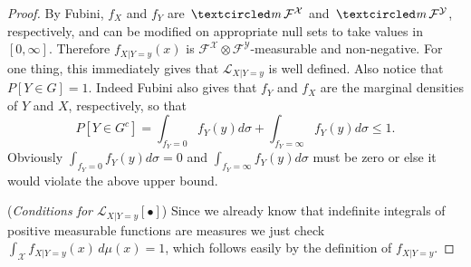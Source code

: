 \begin{proof}


By Fubini, $f_X$ and $f_Y$ are $\mcirc \mathcal F^{\mathcal X}$ and $\mcirc \mathcal F^{\mathcal Y}$, respectively, and can be modified on appropriate null sets to take values in $[0,\infty]$. Therefore
$f_{X|Y = y}(x)$ is $\mathcal F^{\mathcal X}\otimes \mathcal F^{\mathcal Y}$-measurable and non-negative.
For one thing, this immediately gives that $\mathcal L_{X|Y=y}$ is well defined.
Also notice that $P[Y\in G] = 1$. Indeed Fubini also gives that $f_Y$ and $f_X$ are the marginal densities of $Y$ and $X$, respectively, so that
\[ P[Y\in G^c] = \int_{f_Y=0} f_Y(y)d\sigma + \int_{f_Y=\infty} f_Y(y)d\sigma \leq 1.  \]
Obviously $ \int_{f_Y=0} f_Y(y)d\sigma = 0$ and $\int_{f_Y=\infty} f_Y(y)d\sigma$ must be zero or else it would violate the above upper bound.


({\sl Conditions for  $\mathcal L_{X|Y=y}[\bullet]$})
Since we already know that indefinite integrals of positive measurable functions are measures we just check  $\int_{\mathcal X} f_{X|Y = y}(x)\,d\mu(x)=1$, which follows easily by the definition of $f_{X|Y = y}$.


\end{proof}
